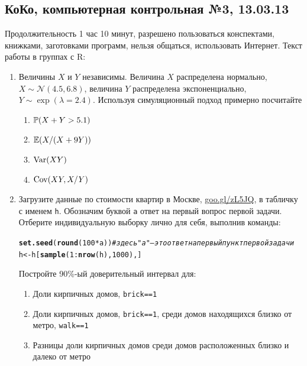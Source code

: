 \documentclass[12pt, a4paper]{article}\usepackage[]{graphicx}\usepackage[]{color}
\makeatletter
\newcommand{\hlnum}[1]{\textcolor[rgb]{0.686,0.059,0.569}{#1}}%
\newcommand{\hlcom}[1]{\textcolor[rgb]{0.678,0.584,0.686}{\textit{#1}}}%
\newcommand{\hlopt}[1]{\textcolor[rgb]{0,0,0}{#1}}%
\newcommand{\hlstd}[1]{\textcolor[rgb]{0.345,0.345,0.345}{#1}}%
\newcommand{\hlkwb}[1]{\textcolor[rgb]{0.69,0.353,0.396}{#1}}%
\newcommand{\hlkwd}[1]{\textcolor[rgb]{0.737,0.353,0.396}{\textbf{#1}}}%
\newenvironment{kframe}{%
 \def\at@end@of@kframe{}%
 \ifinner\ifhmode%
  \def\at@end@of@kframe{\end{minipage}}%
  \begin{minipage}{\columnwidth}%
 \fi\fi%
 \def\FrameCommand##1{\hskip\@totalleftmargin \hskip-\fboxsep
 \colorbox{shadecolor}{##1}\hskip-\fboxsep
     \hskip-\linewidth \hskip-\@totalleftmargin \hskip\columnwidth}%
 \MakeFramed {\advance\hsize-\width
   \@totalleftmargin\z@ \linewidth\hsize
   \@setminipage}}%
 {\par\unskip\endMakeFramed%
 \at@end@of@kframe}
\newenvironment{knitrout}{}{} %
\newcommand{\cN}{\mathcal{N}}
\makeatother
\begin{document}
\subsection{КоКо, компьютерная контрольная №3, 13.03.13}

Продолжительность 1 час 10 минут, разрешено пользоваться конспектами, книжками, заготовками программ, нельзя общаться, использовать Интернет. Текст работы в группах с R:

\begin{enumerate}
\item Величины $X$ и $Y$ независимы. Величина $X$ распределена нормально, $X\sim \cN(4.5,6.8)$, величина $Y$ распределена экспоненциально, $Y\sim \exp(\lambda=2.4)$. Используя симуляционный подход примерно посчитайте

\begin{enumerate}
\item $\P(X+Y>5.1)$
\item $\E(X/(X+9Y))$
\item $\Var(XY)$
\item $\Cov(XY,X/Y)$
\end{enumerate}

\item Загрузите данные по стоимости квартир в Москве, \href{http://goo.gl/zL5JQ}{goo.gl/zL5JQ}, в табличку с именем \verb|h|. Обозначим буквой \verb|a| ответ на первый вопрос первой задачи. Отберите индивидуальную выборку лично для себя, выполнив команды:
\begin{knitrout}
\color{fgcolor}\begin{kframe}
\begin{alltt}
\hlkwd{set.seed}\hlstd{(}\hlkwd{round}\hlstd{(}\hlnum{100} \hlopt{*} \hlstd{a))} \hlcom{# здесь "a" — это ответ на первый пункт первой задачи}
\hlstd{h} \hlkwb{<-} \hlstd{h[}\hlkwd{sample}\hlstd{(}\hlnum{1}\hlopt{:}\hlkwd{nrow}\hlstd{(h),} \hlnum{1000}\hlstd{), ]}
\end{alltt}
\end{kframe}
\end{knitrout}

Постройте 90\%-ый доверительный интервал для:
\begin{enumerate}
\item Доли кирпичных домов, \verb|brick==1|
\item Доли кирпичных домов, \verb|brick==1|, среди домов находящихся близко от метро,  \verb|walk==1|
\item Разницы доли кирпичных домов среди домов расположенных близко и далеко от метро
\end{enumerate}



\end{enumerate}
\end{document}
